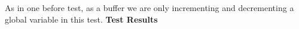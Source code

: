 \documentclass{article}
\begin{document}
\begin{figure}[H]
    \centering
    \qquad
    
\end{figure}
\hfill \break 
As in one before test, as a buffer we are only incrementing and decrementing a global variable in this test.
\cleardoublepage 
\textbf{Test Results} \\
\end{document}
